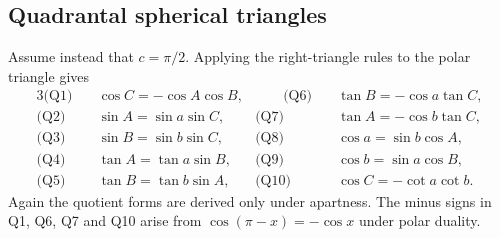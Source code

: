 \subsection{Quadrantal spherical triangles}

Assume instead that \(c=\pi/2\).  Applying the right-triangle rules to the
polar triangle gives
\begin{alignat}{3}
 \text{(Q1)}\quad&\cos C=-\cos A\cos B,
 &\qquad \text{(Q6)}\quad&\tan B=-\cos a\tan C,            \tag{8.16}\\
 \text{(Q2)}\quad&\sin A=\sin a\sin C,
 &\text{(Q7)}\quad&\tan A=-\cos b\tan C,                   \tag{8.17}\\
 \text{(Q3)}\quad&\sin B=\sin b\sin C,
 &\text{(Q8)}\quad&\cos a=\sin b\cos A,                  \tag{8.18}\\
 \text{(Q4)}\quad&\tan A=\tan a\sin B,
 &\text{(Q9)}\quad&\cos b=\sin a\cos B,                  \tag{8.19}\\
 \text{(Q5)}\quad&\tan B=\tan b\sin A,
 &\text{(Q10)}\quad&\cos C=-\cot a\cot b.                \tag{8.20}
\end{alignat}
Again the quotient forms are derived only under apartness.  The minus signs in
Q1, Q6, Q7 and Q10 arise from
\(\cos(\pi-x)=-\cos x\) under polar duality.
